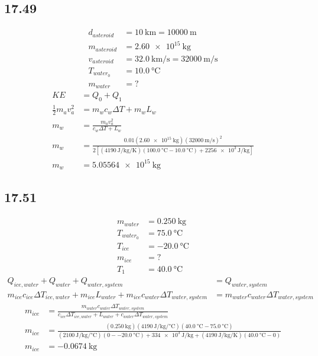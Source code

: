 \documentclass{article}
\begin{document}
\subsection{17.49}

\begin{align*}
	d_{asteroid} & = \SI{10}{\kilo \meter} = \SI{10000}{\meter} \\
	m_{asteroid} & = \SI{2.60e15}{\kilogram} \\
	v_{asteroid} & = \SI{32.0}{\kilo \meter \per \second} = \SI{32000}{\meter \per \second} \\
	T_{water_0} & = \SI{10.0}{\celsius} \\
	m_{water} & = ?
\end{align*}
\begin{align*}
	KE & = Q_0 + Q_1 \\
	\frac{1}{2}m_{a}v_{a}^2 & = m_{w}c_{w}\Delta T + m_{w}L_{w} \\
	m_{w} & = \frac{ m_{a}v_{a}^2 }{ c_{w}\Delta T + L_{w} } \\
	m_{w} & = \frac{ 0.01(\SI{2.60e15}{\kilogram})(\SI{32000}{\meter \per \second})^2 }{ 2 \left[ (\SI{4190}{\joule \per \kilogram \per \kelvin})(\SI{100.0}{\celsius} - \SI{10.0}{\celsius}) + \SI{2256e3}{\joule \per \kilogram} \right] } \\
	m_{w} & = \SI{5.05564e15}{\kilogram}
\end{align*}

\subsection{17.51}

\begin{align*}
	m_{water} & = \SI{0.250}{\kilogram} \\
	T_{water_0} & = \SI{75.0}{\celsius} \\
	T_{ice} & = \SI{-20.0}{\celsius} \\
	m_{ice} & = ? \\
	T_{1} & = \SI{40.0}{\celsius}
\end{align*}
\begin{align*}
	Q_{ice,water} + Q_{water} + Q_{water,system} & = Q_{water,system} \\
	m_{ice}c_{ice}\Delta T_{ice,water} + m_{ice}L_{water} + m_{ice}c_{water}\Delta T_{water,system} & = m_{water}c_{water}\Delta T_{water,system}
\end{align*}
\begin{align*}
	m_{ice} & = \frac{ m_{water}c_{water}\Delta T_{water,system} }{ c_{ice}\Delta T_{ice,water} + L_{water} + c_{water}\Delta T_{water,system} } \\
	m_{ice} & = \frac{ (\SI{0.250}{\kilogram})(\SI{4190}{\joule \per \kilogram \per \celsius})(\SI{40.0}{\celsius} - \SI{75.0}{\celsius}) }{ (\SI{2100}{\joule \per \kilogram \per \celsius})(0 - \SI{-20.0}{\celsius}) + \SI{334e3}{\joule \per \kilogram} + (\SI{4190}{\joule \per \kilogram \per \kelvin})(\SI{40.0}{\celsius} - 0) } \\
	m_{ice} & = \SI{-0.0674}{\kilogram}
\end{align*}
\end{document}
